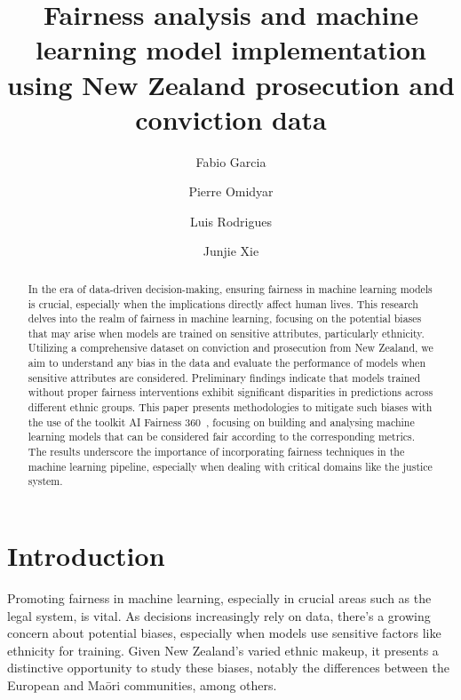 \documentclass[runningheads]{llncs}
\begin{document}
\title{Fairness analysis and machine learning model implementation
    using New Zealand prosecution and conviction data}


\author{Fabio Garcia \and Pierre Omidyar \and Luis Rodrigues \and
    Junjie Xie}



\maketitle

\begin{abstract}
    In the era of data-driven decision-making, ensuring fairness in
    machine learning models is crucial, especially when the
    implications directly affect human lives. This research delves
    into the realm of fairness in machine learning, focusing on the
    potential biases that may arise when models are trained on
    sensitive attributes, particularly ethnicity. Utilizing a
    comprehensive dataset on conviction and prosecution from New
    Zealand, we aim to understand any bias in the data and evaluate
    the performance of models when sensitive attributes are
    considered. Preliminary findings indicate that models trained
    without proper fairness interventions exhibit significant
    disparities in predictions across different ethnic groups. This
    paper presents methodologies to mitigate such biases with the use
    of the toolkit AI Fairness 360~\cite{bellamy2018ai}, focusing on
    building and analysing machine learning models that can be
    considered fair according to the corresponding metrics. The
    results underscore the importance of incorporating fairness
    techniques in the machine learning pipeline, especially when
    dealing with critical domains like the justice system.
\end{abstract}

\section{Introduction}
\label{sec:introduction}

Promoting fairness in machine learning, especially in crucial areas
such as the legal system, is vital. As decisions increasingly rely on
data, there's a growing concern about potential biases, especially
when models use sensitive factors like ethnicity for training. Given
New Zealand's varied ethnic makeup, it presents a distinctive
opportunity to study these biases, notably the differences between the
European and Ma\=ori communities, among others.
\end{document}
